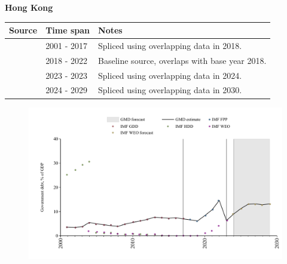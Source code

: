 \documentclass[12pt,a4paper,landscape]{article}
\begin{document}
\begin{adjustbox}{max totalsize={\paperwidth}{\paperheight},center}
\begin{minipage}[t][\textheight][t]{\textwidth}
\vspace*{0.5cm}
{}
\begin{center}
{\Large\bfseries Hong Kong}
\end{center}
\vspace{0.5cm}
\begin{table}[H]
\centering
\small
\begin{tabular}{|l|l|l|}
\hline
\textbf{Source} & \textbf{Time span} & \textbf{Notes} \\
\hline
\rowcolor{white}\cite{IMF_GDD}& 2001 - 2017 &Spliced using overlapping data in 2018.\\
\rowcolor{lightgray}\cite{IMF_FPP}& 2018 - 2022 &Baseline source, overlaps with base year 2018.\\
\rowcolor{white}\cite{IMF_WEO}& 2023 - 2023 &Spliced using overlapping data in 2024.\\
\rowcolor{lightgray}\cite{IMF_WEO_forecast}& 2024 - 2029 &Spliced using overlapping data in 2030.\\
\hline
\end{tabular}
\end{table}
\begin{figure}[H]
\centering
\includegraphics[width=\textwidth,height=0.6\textheight,keepaspectratio]{graphs/HKG_govdebt_GDP.pdf}
\end{figure}
\end{minipage}
\end{adjustbox}
\end{document}
